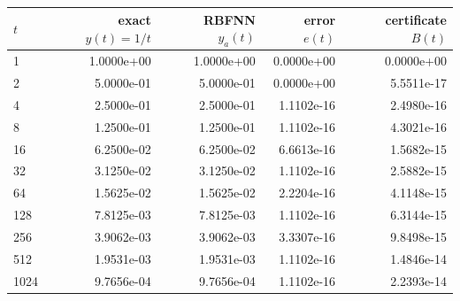 \begin{tabular}{lrrrr}
\toprule
$t$ & exact $y(t)=1/t$ & RBFNN $y_a(t)$ & error $e(t)$ & certificate $B(t)$ \\
\midrule
1 & 1.0000e+00 & 1.0000e+00 & 0.0000e+00 & 0.0000e+00 \\
2 & 5.0000e-01 & 5.0000e-01 & 0.0000e+00 & 5.5511e-17 \\
4 & 2.5000e-01 & 2.5000e-01 & 1.1102e-16 & 2.4980e-16 \\
8 & 1.2500e-01 & 1.2500e-01 & 1.1102e-16 & 4.3021e-16 \\
16 & 6.2500e-02 & 6.2500e-02 & 6.6613e-16 & 1.5682e-15 \\
32 & 3.1250e-02 & 3.1250e-02 & 1.1102e-16 & 2.5882e-15 \\
64 & 1.5625e-02 & 1.5625e-02 & 2.2204e-16 & 4.1148e-15 \\
128 & 7.8125e-03 & 7.8125e-03 & 1.1102e-16 & 6.3144e-15 \\
256 & 3.9062e-03 & 3.9062e-03 & 3.3307e-16 & 9.8498e-15 \\
512 & 1.9531e-03 & 1.9531e-03 & 1.1102e-16 & 1.4846e-14 \\
1024 & 9.7656e-04 & 9.7656e-04 & 1.1102e-16 & 2.2393e-14 \\
\bottomrule
\end{tabular}
